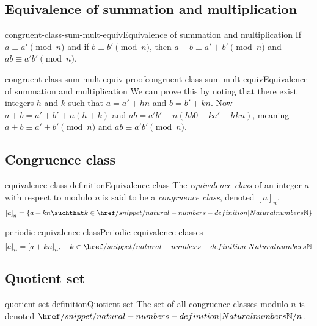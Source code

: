 \documentclass[preview]{standalone}
\begin{document}
\subsection{Equivalence of summation and multiplication}

\begin{snippetproposition}{congruent-class-sum-mult-equiv}{Equivalence of summation and multiplication}
    If \(a \equiv a' \pmod{n}\) and if \(b \equiv b' \pmod{n}\), then
    \(a+b \equiv a' + b' \pmod{n}\) and \(ab \equiv a'b' \pmod{n}\).
\end{snippetproposition}

\begin{snippetproof}{congruent-class-sum-mult-equiv-proof}{congruent-class-sum-mult-equiv}{Equivalence of summation and multiplication}
    We can prove this by noting that there exist integers \(h\) and \(k\) such that
    \(a=a'+hn\) and \(b=b'+kn\).
    Now \(a+b = a'+b'+n(h+k)\) and \(ab=a'b' + n(hb0+ka'+hkn)\), meaning
    \(a+b \equiv a' + b' \pmod{n}\) and \(ab \equiv a'b' \pmod{n}\).
\end{snippetproof}

\subsection{Congruence class}

\begin{snippetdefinition}{equivalence-class-definition}{Equivalence class}
    The \textit{equivalence class} of an integer \(a\) with respect to modulo \(n\)
    is said to be a \textit{congruence class}, denoted \({[a]}_n\).
    \[
        {[a]}_n = \{a+kn \suchthat k \in \naturalnumbers\}
    \]
\end{snippetdefinition}

\begin{snippetproposition}{periodic-equivalence-class}{Periodic equivalence classes}
    \[
        {[a]}_n = {[a + kn]}_n,\quad k \in \naturalnumbers
    \]
\end{snippetproposition}

\subsection{Quotient set}

\begin{snippetdefinition}{quotient-set-definition}{Quotient set}
    The set of all congruence classes modulo \(n\) is denoted \(\naturalnumbers / n\).
\end{snippetdefinition}
\end{document}
